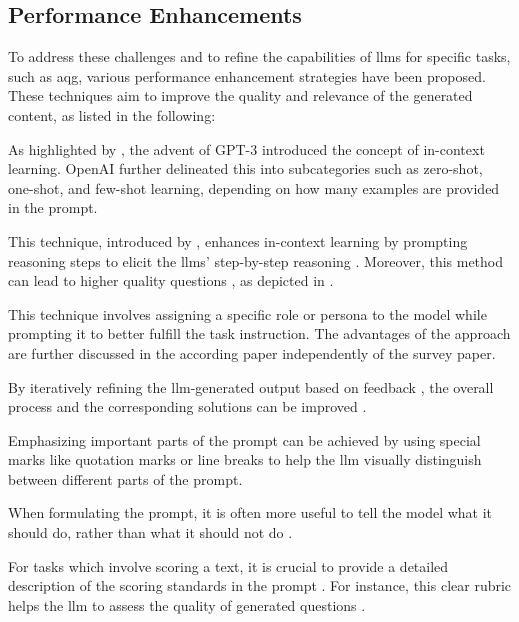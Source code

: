 \pagebreak

\subsection{Performance Enhancements}
\label{sec:performance-enhancements}

To address these challenges and to refine the capabilities of \ac{llms} for specific tasks, such as \ac{aqg}, various performance enhancement strategies have been proposed. These techniques aim to improve the quality and relevance of the generated content, as listed in the following:

 As highlighted by \cite{zhao_survey_2025}, the advent of GPT-3 \cite{brown_language_2020} introduced the concept of in-context learning. OpenAI further delineated this into subcategories such as zero-shot, one-shot, and few-shot learning, depending on how many examples are provided in the prompt.

 This technique, introduced by \cite{wei_chain--thought_2022}, enhances in-context learning by prompting reasoning steps to elicit the \ac{llms}' step-by-step reasoning \cite{zhao_survey_2025}. Moreover, this method can lead to higher quality questions \cite{scaria_automated_2024}, as depicted in \cite{wei_chain--thought_2022}.

 This technique involves assigning a specific role or persona to the model while prompting it \cite{zhao_survey_2025} to better fulfill the task instruction. The advantages of the approach are further discussed in the according paper \cite{kong_better_2024} independently of the survey paper.

 By iteratively refining the \ac{llm}-generated output based on feedback \cite{madaan_self-refine_2023}, the overall process and the corresponding solutions can be improved \cite{zhao_survey_2025}.

 Emphasizing important parts of the prompt can be achieved by using special marks like quotation marks or line breaks \cite{zhao_survey_2025} to help the \ac{llm} visually distinguish between different parts of the prompt. 

 When formulating the prompt, it is often more useful to tell the model what it should do, rather than what it should not do \cite{zhao_survey_2025}. 

 For tasks which involve scoring a text, it is crucial to provide a detailed description of the scoring standards in the prompt \cite{zhao_survey_2025}. For instance, this clear rubric helps the \ac{llm} to assess the quality of generated questions \cite{scaria_automated_2024}.

